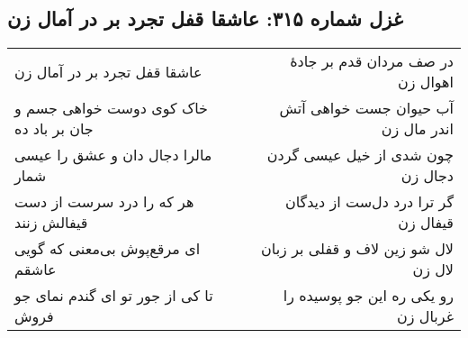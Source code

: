 \begin{center}
\section*{غزل شماره ۳۱۵: عاشقا قفل تجرد بر در آمال زن}
\label{sec:315}
\begin{longtable}{l p{0.5cm} r}
عاشقا قفل تجرد بر در آمال زن
&&
در صف مردان قدم بر جادهٔ اهوال زن
\\
خاک کوی دوست خواهی جسم و جان بر باد ده
&&
آب حیوان جست خواهی آتش اندر مال زن
\\
مالرا دجال دان و عشق را عیسی شمار
&&
چون شدی از خیل عیسی گردن دجال زن
\\
هر که را درد سرست از دست قیفالش زنند
&&
گر ترا درد دل‌ست از دیدگان قیفال زن
\\
ای مرقع‌پوش بی‌معنی که گویی عاشقم
&&
لال شو زین لاف و قفلی بر زبان لال زن
\\
تا کی از جور تو ای گندم نمای جو فروش
&&
رو یکی ره این جو پوسیده را غربال زن
\\
\end{longtable}
\end{center}
